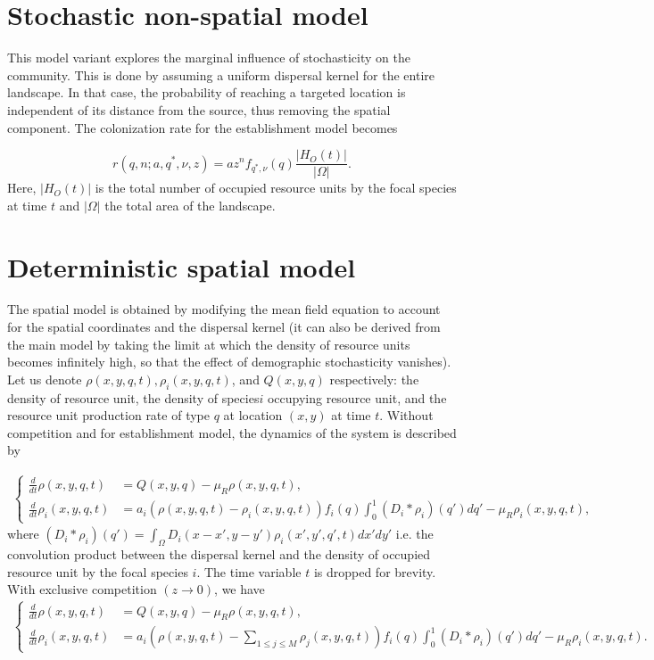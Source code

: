 \documentclass[8pt,a4paper]{article}
\begin{document}
\section{Stochastic non-spatial model}

This model variant explores the marginal influence of stochasticity on the community. This is done by assuming a uniform dispersal kernel for the entire landscape. In that case, the probability of reaching a targeted location is independent of its distance from the source, thus removing the spatial component.  The colonization rate for the establishment model becomes 

\begin{equation*}
r(q, n ; a , q^*, \nu, z) = a z^n f_{q^*, \nu} (q)\frac{|H_O(t)|}{|\Omega|}.
\end{equation*}
Here, $|H_O(t)|$ is the total number of occupied resource units by the focal species at time $t$ and $|\Omega|$ the total area of the landscape.

\section{Deterministic spatial model}

The spatial model is obtained by modifying the mean field equation to account for the spatial coordinates and the dispersal kernel (it can also be derived from the main model by taking the limit at which the density of resource units becomes infinitely high, so that the effect of demographic stochasticity vanishes).  Let us denote $\rho(x,y,q,t), \rho_i (x,y ,q,t)$, and  $Q(x,y,q)$ respectively:  the density of resource unit,  the density of species$i$ occupying resource unit, and the resource unit production rate of type $q$ at location $(x,y)$ at time $t$. 
Without competition and for establishment model, the dynamics of the system is described by

\begin{align*}
\begin{cases}
\displaystyle  \frac{d}{dt} \rho(x,y,q,t) & =  Q(x,y,q) - \mu_R \rho(x,y,q,t), \\
\displaystyle \frac{d}{dt} \rho_i (x,y,q,t) & =  a_i \left( \rho(x,y,q,t)- \rho_i(x,y,q,t) \right) f_i(q) \int_0^1 (D_i \ast \rho_i) (q') dq' - \mu_R \rho_i(x,y,q,t), 
\end{cases}
\end{align*}
where $(D_i \ast \rho_i)(q') = \int_{\Omega} D_i(x- x', y-y') \rho_i(x',y',q',t) dx' dy'$ i.e. the convolution product between the dispersal kernel and the density of occupied resource unit by the focal species $i$. The time variable $t$  is dropped for brevity.  
With exclusive competition $(z \rightarrow 0)$, we have   
\begin{align*}
\begin{cases}
\displaystyle \frac{d}{dt} \rho(x,y,q,t) &=  Q(x,y,q) - \mu_R \rho(x,y,q,t), \\
\displaystyle \frac{d}{dt}  \rho_i (x,y,q,t) &=  a_i \left( \rho(x,y,q,t)- \sum_{1\leq j \leq M}\rho_j(x,y,q,t) \right) f_i(q) \int_0^1 (D_i \ast \rho_i) (q') dq' - \mu_R \rho_i(x,y,q,t).
\end{cases}
\end{align*}
\end{document}
